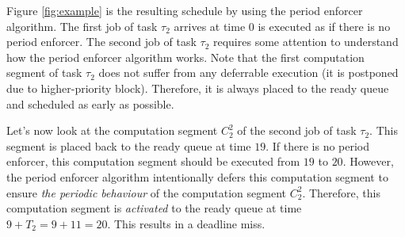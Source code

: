 Figure \ref{fig:example} is the resulting schedule by using the period enforcer algorithm. The first job of task $\tau_2$ arrives at time $0$ is executed as if there is no period enforcer. The second job of task $\tau_2$ requires some attention to understand how the period enforcer algorithm works. Note that the first computation segment of task $\tau_2$ does not suffer from any deferrable execution (it is postponed due to higher-priority block). Therefore, it is always placed to the ready queue and scheduled as early as possible.

Let's now look at the computation segment $C_2^2$ of the second job of task $\tau_2$. This segment is placed back to the ready queue at time $19$. If there is no period enforcer, this computation segment should be executed from $19$ to $20$. However, the period enforcer algorithm intentionally defers this computation segment to ensure \emph{the periodic behaviour} of the computation segment $C_2^2$. Therefore, this computation segment is \emph{activated} to the ready queue at time $9+T_2=9+11=20$. This results in a deadline miss.


